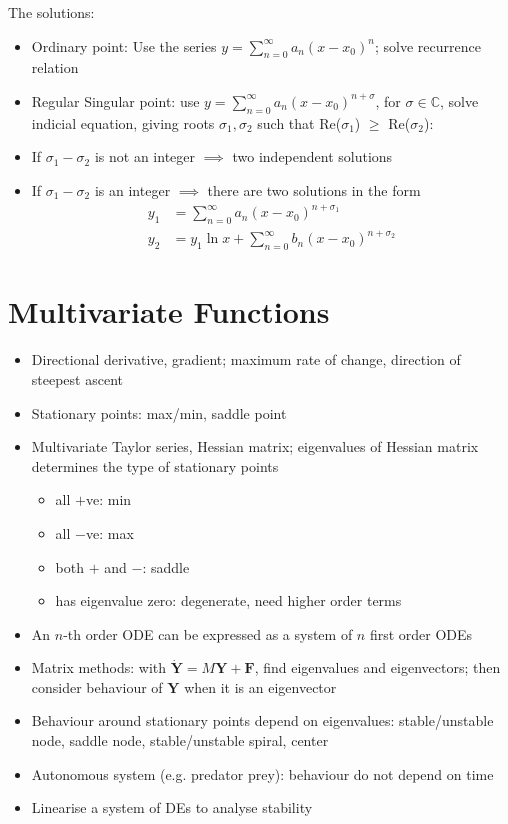 \begin{itemize}
            The solutions:
            \begin{itemize}
                  \item Ordinary point: Use the series $y=\sum_{n=0}^{\infty} a_n (x-x_0)^n$; solve recurrence relation
                  \item Regular Singular point: use $y=\sum_{n=0}^{\infty} a_n (x-x_0)^{n+\sigma}$, for $\sigma \in \mathbb{C} $, solve indicial equation, giving roots $\sigma_1, \sigma_2$ such that Re($\sigma_1$) $\geq$ Re($\sigma_2$):
                  \item If $\sigma_1 - \sigma_2$ is not an integer $\implies $ two independent solutions
                  \item If $\sigma_1 - \sigma_2$ is an integer $\implies$ there are two solutions in the form
                        \begin{align*}
                              y_1 & = \sum_{n=0}^{\infty}a_n (x-x_0)^{n+\sigma_1}             \\
                              y_2 & = y_1 \ln x + \sum_{n=0}^{\infty}b_n (x-x_0)^{n+\sigma_2}\end{align*}
            \end{itemize}
\end{itemize}

\section{Multivariate Functions}
\begin{itemize}
      \item Directional derivative, gradient; maximum rate of change, direction of steepest ascent
      \item Stationary points: max/min, saddle point
      \item Multivariate Taylor series, Hessian matrix; eigenvalues of Hessian matrix determines the type of stationary points
            \begin{itemize}
                  \item all $+$ve: min
                  \item all $-$ve: max
                  \item both $+$ and $-$: saddle
                  \item has eigenvalue zero: degenerate, need higher order terms
            \end{itemize}
      \item An $n$-th order ODE can be expressed as a system of $n$ first order ODEs
      \item Matrix methods: with $\mathbf{\dot{Y}}=M \mathbf{Y}+\mathbf{F}$, find eigenvalues and eigenvectors; then consider behaviour of $\mathbf{Y}$ when it is an eigenvector
      \item Behaviour around stationary points depend on eigenvalues: stable/unstable node, saddle node, stable/unstable spiral, center
      \item Autonomous system (e.g. predator prey): behaviour do not depend on time
      \item Linearise a system of DEs to analyse stability
\end{itemize}

